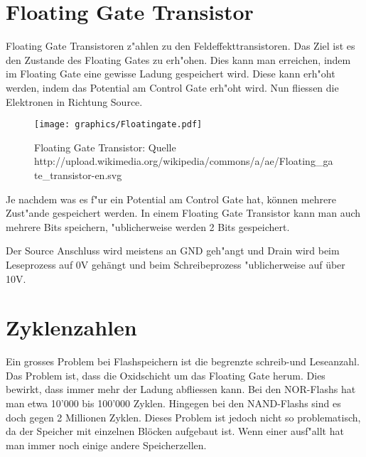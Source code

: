 \begin{refsection}
\section{Floating Gate Transistor}
Floating Gate Transistoren z"ahlen zu den Feldeffekttransistoren. Das Ziel ist es den Zustande des Floating Gates zu erh"ohen. Dies kann man erreichen, indem im Floating Gate eine gewisse Ladung gespeichert wird. Diese kann erh"oht werden, indem das Potential am Control Gate erh"oht wird. Nun fliessen die Elektronen in Richtung Source. 

\begin{figure}[h]
\centering
\texttt{[image: graphics/Floatingate.pdf]}
\caption{Floating Gate Transistor: Quelle http://upload.wikimedia.org/wikipedia/commons/a/ae/Floating_gate_transistor-en.svg
\label{skript:Flash}}
\end{figure}

Je nachdem was es f"ur ein Potential am Control Gate hat, können mehrere Zust"ande gespeichert werden. In einem Floating Gate Transistor kann man auch mehrere Bits speichern, "ublicherweise werden 2 Bits gespeichert.

Der Source Anschluss wird meistens an GND geh"angt und Drain wird beim Leseprozess auf 0V gehängt und beim Schreibeprozess "ublicherweise auf über 10V. 


\section{Zyklenzahlen}
Ein grosses Problem bei Flashspeichern ist die begrenzte schreib-und Leseanzahl. Das Problem ist, dass die Oxidschicht um das Floating Gate herum. Dies bewirkt, dass immer mehr der Ladung abfliessen kann. Bei den NOR-Flashs hat man etwa 10'000 bis 100'000 Zyklen. Hingegen bei den NAND-Flashs sind es doch gegen 2 Millionen Zyklen. Dieses Problem ist jedoch nicht so problematisch, da der Speicher mit einzelnen Blöcken aufgebaut ist. Wenn einer ausf"allt hat man immer noch einige andere Speicherzellen.


\end{refsection}
